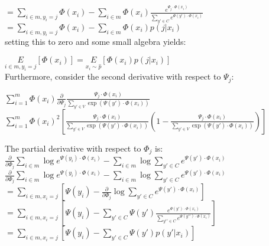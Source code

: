 \documentclass[]{article}
\begin{document}
$ = \underset{i \in m, y_i = j}{\sum} \Phi(x_i) -  \underset{i \in m}{\sum} \Phi(x_i) \frac{e^{\Psi_j \cdot \Phi(x_i)}}{\sum_{y\prime \in C}e^{\Psi(y') \cdot \Phi(x_i)}}$\\

$ = \underset{i \in m, y_i = j}{\sum} \Phi(x_i) -  \underset{i \in m}{\sum} \Phi(x_i) p(j|x_i)$\\

\noindent setting this to zero and some small algebra yields:

$\underset{i \in m, y_i = j}{E}\left[\Phi(x_i)\right] = \underset{x_i \sim \hat{p}}{E}\left[\Phi(x_i) p(j|x_i)\right]$\\

\noindent Furthermore, consider the second derivative with respect to $\Psi_j$:

$\sum_{i=1}^{m} \Phi(x_i) \frac{\partial}{\partial \Psi_j} \frac{\Psi_j \cdot \Phi(x_i)}{\sum_{y\prime \in V} \exp(\Psi(y\prime) \cdot \Phi(x_i))}$\\

$\sum_{i=1}^{m} \Phi(x_i)^2 \left[ \frac{\Psi_j \cdot \Phi(x_i)}{\sum_{y\prime \in V} \exp(\Psi(y\prime) \cdot \Phi(x_i))} (1 - \frac{\Psi_j \cdot \Phi(x_i)}{\sum_{y\prime \in V} \exp(\Psi(y\prime) \cdot \Phi(x_i))}) \right]$



\noindent The partial derivative with respect to $\Phi_j$ is:\\

$\frac{\partial}{\partial \Phi_j} \underset{i \in m}{\sum} \log e^{\Psi(y_i) \cdot \Phi(x_i)} - \underset{i \in m}{\sum} \log \sum_{y\prime \in C}e^{\Psi(y') \cdot \Phi(x_i)}$\\

$\frac{\partial}{\partial \Phi_j} \underset{i \in m}{\sum} \log e^{\Psi(y_i) \cdot \Phi(x_i)} - \underset{i \in m}{\sum} \log \sum_{y\prime \in C}e^{\Psi(y') \cdot \Phi(x_i)}$\\

$ = \underset{i \in m, x_i = j}{\sum} \left[\Psi(y_i) - \frac{\partial}{\partial \Phi_j} \log \sum_{y\prime \in C}e^{\Psi(y\prime) \cdot \Phi(x_i)}\right]$\\

$ = \underset{i \in m, x_i = j}{\sum} \left[\Psi(y_i) - \sum_{y\prime \in C}\Psi(y') \frac{e^{\Psi(y') \cdot \Phi(x_i)}}{\sum_{y\prime\prime \in C}e^{\Psi(y\prime\prime) \cdot \Phi(x_i)}}\right]$\\

$ = \underset{i \in m, x_i = j}{\sum} \left[\Psi(y_i) - \sum_{y\prime \in C}\Psi(y') p(y\prime|x_i)\right]$\\
\end{document}
